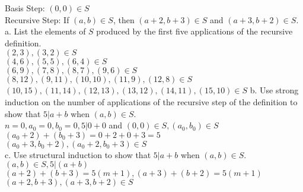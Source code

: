 \documentclass[a4paper]{article}
\newcommand\tab[1][0.5cm]{\hspace*{#1}}
\begin{document}
\begin{itemize}
    \tab Basis Step: $(0, 0) \in S$ \\
    \tab Recursive Step: If $(a, b) \in S$, then $(a + 2, b + 3) \in S$ and $(a + 3, b + 2) \in S$. \\
      a. List the elements of $S$ produced by the first five applications of the recursive definition. \\
      \tab $(2,3),(3,2) \in S$ \\
      \tab $(4,6),(5,5),(6,4) \in S$ \\
      \tab $(6,9),(7,8),(8,7),(9,6) \in S$ \\
      \tab $(8,12),(9,11),(10,10),(11,9),(12,8) \in S$ \\
      \tab $(10,15),(11,14),(12,13),(13,12),(14,11),(15,10) \in S$
      b. Use strong induction on the number of applications of the recursive step of the definition to show that $5 | a + b$ when $(a, b) \in S$. \\
      \tab $n = 0, a_{0} = 0, b_{0} = 0, 5 | 0 + 0$ and $(0, 0) \in S, (a_{0}, b_{0}) \in S$ \\
      \tab $(a_{0} + 2) + (b_{0} + 3) = 0 + 2 + 0 + 3 = 5$ \\
      \tab $(a_{0} + 3, b_{0} + 2), (a_{0} + 2, b_{0} + 3) \in S$ \\
      c. Use structural induction to show that $5 | a + b$ when $(a, b) \in S$. \\
      \tab $(a, b) \in S, 5|(a + b)$ \\
      \tab $(a + 2) + (b + 3) = 5(m + 1), (a + 3) + (b + 2) = 5(m + 1)$ \\
      \tab $(a + 2, b + 3), (a + 3, b + 2) \in S$
  \end{itemize}
 

  
  
\end{document}
